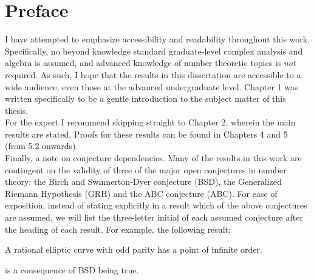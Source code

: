 \documentclass [11pt, proquest] {thesis}[2015/03/03]
\begin{document}
\chapter*{Preface}
I have attempted to emphasize accessibility and readability throughout this work. Specifically, no beyond knowledge standard graduate-level complex analysis and algebra is assumed, and advanced knowledge of number theoretic topics is {\it not} required. As such, I hope that the results in this dissertation are accessible to a wide audience, even those at the advanced undergraduate level. Chapter 1 was written specifically to be a gentle introduction to the subject matter of this thesis. \\

For the expert I recommend skipping straight to Chapter 2, wherein the main results are stated. Proofs for these results can be found in Chapters 4 and 5 (from 5.2 onwards). \\

Finally, a note on conjecture dependencies. Many of the results in this work are contingent on the validity of three of the major open conjectures in number theory: the Birch and Swinnerton-Dyer conjecture (BSD), the Generalized Riemann Hypothesis (GRH) and the ABC conjecture (ABC). For ease of exposition, instead of stating explicitly in a result which of the above conjectures are assumed, we will list the three-letter initial of each assumed conjecture after the heading of each result. For example, the following result:
\begin{proposition}[BSD]
A rational elliptic curve with odd parity has a point of infinite order.
\end{proposition}
is a consequence of BSD being true.

%
%
\tableofcontents
 
\end{document}
